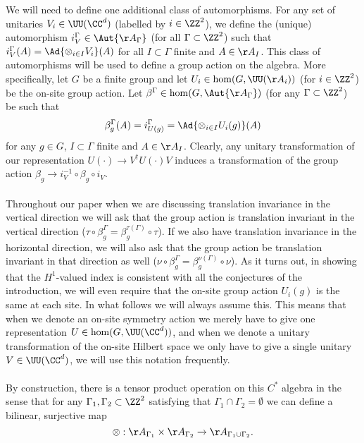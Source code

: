 We will need to define one additional class of automorphisms. For any set of unitaries $V_i\in\UU(\CC^d)$ (labelled by $i\in\ZZ^2$), we define the (unique) automorphism $i_V^\Gamma\in\Aut{\AA_\Gamma}$ (for all $\Gamma\subset \ZZ^2$) such that $i_V^\Gamma (A)=\Ad{\otimes_{i\in I} V_i}(A)$ for all $I\subset\Gamma$ finite and $A\in\AA_I$. This class of automorphisms will be used to define a group action on the algebra. More specifically, let $G$ be a finite group and let $U_i\in\hom(G,\UU(\AA_i))$ (for $i\in\ZZ^2$) be the on-site group action. Let $\beta^\Gamma\in\hom(G,\Aut{\AA_\Gamma})$ (for any $\Gamma\subset\ZZ^2$) be such that
\begin{equation}
	\beta^\Gamma_g(A)=i_{U(g)}^\Gamma=\Ad{\otimes_{i\in I} U_i(g)}(A)
\end{equation}
for any $g\in G$, $I\subset\Gamma$ finite and $A\in\AA_I$. Clearly, any unitary transformation of our representation $U(\cdot)\rightarrow V^\dagger U(\cdot) V$ induces a transformation of the group action $\beta_g\rightarrow i_{V}^{-1}\circ\beta_g\circ i_V$.\\\\
Throughout our paper when we are discussing translation invariance in the vertical direction we will ask that the group action is translation invariant in the vertical direction ($\tau\circ\beta_g^\Gamma=\beta_g^{\tau(\Gamma)}\circ\tau$). If we also have translation invariance in the horizontal direction, we will also ask that the group action be translation invariant in that direction as well ($\nu\circ\beta_g^\Gamma=\beta_g^{\nu(\Gamma)}\circ\nu$). As it turns out, in showing that the $H^1$-valued index is consistent with all the conjectures of the introduction, we will even require that the on-site group action $U_i(g)$ is the same at each site. In what follows we will always assume this. This means that when we denote an on-site symmetry action we merely have to give one representation $U\in\hom(G,\UU(\CC^d))$, and when we denote a unitary transformation of the on-site Hilbert space we only have to give a single unitary $V\in \UU(\CC^d)$, we will use this notation frequently.\\\\
By construction, there is a tensor product operation on this $C^*$ algebra in the sense that for any $\Gamma_1,\Gamma_2\subset\ZZ^2$ satisfying that $\Gamma_1\cap\Gamma_2=\emptyset$ we can define a bilinear, surjective map
\begin{equation}
	\otimes:\AA_{\Gamma_1}\times\AA_{\Gamma_2}\rightarrow \AA_{\Gamma_1\cup\Gamma_2}.
\end{equation}
